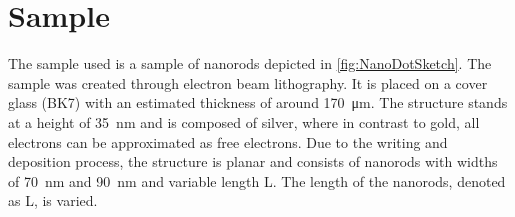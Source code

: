 \section{Sample}
\label{sec:sample}

The sample used is a sample of nanorods depicted in \ref{fig:NanoDotSketch}. 
The sample was created through electron beam lithography. It is placed on a cover glass (BK7) with an estimated thickness of around \SI{170}{\micro\meter}. The structure stands at a height of \SI{35}{\nano\meter} and is composed of silver, where in contrast to gold, all electrons can be approximated as free electrons. Due to the writing and deposition process, the structure is planar and consists of nanorods with widths of \SI{70}{\nano\meter} and \SI{90}{\nano\meter} and variable length L. The length of the nanorods, denoted as L, is varied.